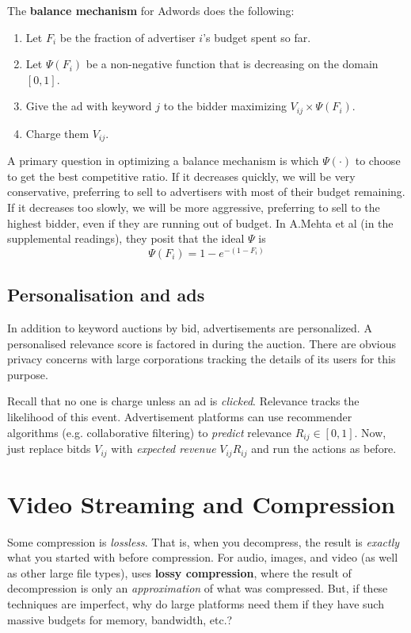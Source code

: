 \documentclass[titlepage, 12pt, leqno]{article}
\begin{document}
\begin{definition}
    The \textbf{balance mechanism} for Adwords does the following:
    \begin{enumerate}
        \item Let $F_{i}$ be the fraction of advertiser $i$'s budget spent so far.
        \item Let $\Psi(F_{i})$ be a non-negative function that is decreasing on
            the domain $[0,1]$.
        \item Give the ad with keyword $j$ to the bidder maximizing $V_{ij} 
            \times  \Psi(F_{i})$.
        \item Charge them $V_{ij}$.
    \end{enumerate}
\end{definition}

A primary question in optimizing a balance mechanism is which $\Psi(\cdot)$ to
choose to get the best competitive ratio. If it decreases quickly, we will be
very conservative, preferring to sell to advertisers with most of their budget
remaining. If it decreases too slowly, we will be more aggressive, preferring to
sell to the highest bidder, even if they are running out of budget. In
A.Mehta et al (in the supplemental readings), they posit that the ideal $\Psi$ is
\[
    \boxed{\Psi(F_{i}) = 1 - e^{-(1-F_{i})}}
\]
\subsection{Personalisation and ads}
In addition to keyword auctions by bid, advertisements are personalized. A
personalised relevance score is factored in during the auction. There are obvious
privacy concerns with large corporations tracking the details of its users for
this purpose.

Recall that no one is charge unless an ad is \textit{clicked}. Relevance tracks
the likelihood of this event. Advertisement platforms can use recommender
algorithms (e.g. collaborative filtering) to \textit{predict} relevance
$R_{ij} \in [0,1]$. Now, just replace bitds $V_{ij}$ with \textit{expected 
revenue} $V_{ij}R_{ij}$ and run the actions as before.

\pagebreak
\section{Video Streaming and Compression}

Some compression is \textit{lossless}. That is, when you decompress, the result is
\textit{exactly} what you started with before compression. For audio, images, and
video (as well as other large file types), uses \textbf{lossy compression}, where
the result of decompression is only an \textit{approximation} of what was 
compressed. But, if these techniques are imperfect, why do large platforms need 
them if they have such massive budgets for memory, bandwidth, etc.?
\end{document}
